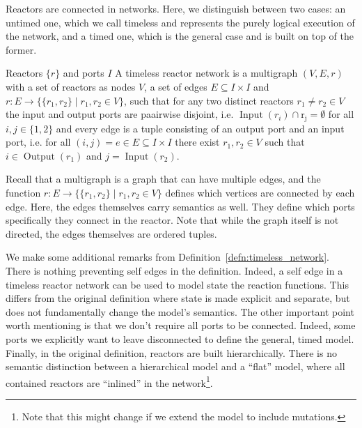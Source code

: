 Reactors are connected in networks.
Here, we distinguish between two cases: an untimed one, which we call timeless and represents the purely logical execution of the network, and a timed one, which is the general case and is built on top of the former.
\begin{defn}
    \label{defn:timeless_network}
    Reactors $\{ r \}$ and ports $I$
A timeless reactor network is a multigraph $(V,E,r)$ with a set of reactors as nodes $V$,
a set of edges $E \subseteq I \times I$ and $r : E \rightarrow \{ \{r_1, r_2\} \mid r_1, r_2 \in V \}$,
such that for any two distinct reactors $r_1 \neq r_2 \in V$ the input and output ports are paairwise disjoint,
i.e. $\operatorname{Input}(r_i) \cap \operatorname{r_j} = \emptyset$ for all $i,j \in \{ 1, 2 \}$ and every edge is a tuple consisting of an output port and an input port,
i.e. for all $(i,j) = e \in E \subseteq I \times I$ there exist $r_1,r_2 \in V$ such that $i \in \operatorname{Output}(r_1)$ and $j = \operatorname{Input}(r_2)$.
\end{defn}

Recall that a multigraph is a graph that can have multiple edges, and the function $r : E \rightarrow \{ \{r_1, r_2\} \mid r_1, r_2 \in V \}$ defines which vertices are connected by each edge.
Here, the edges themselves carry semantics as well. They define which ports specifically they connect in the reactor.
Note that while the graph itself is not directed, the edges themselves are ordered tuples.

We make some additional remarks from Definition~\ref{defn:timeless_network}. 
There is nothing preventing self edges in the definition.
Indeed, a self edge in a timeless reactor network can be used to model state the reaction functions.
This differs from the original definition where state is made explicit and separate, but does not fundamentally change the model's semantics.
The other important point worth mentioning is that we don't require all ports to be connected.
Indeed, some ports we explicitly want to leave disconnected to define the general, timed model. 
Finally, in the original definition, reactors are built hierarchically.
There is no semantic distinction between a hierarchical model and a ``flat'' model, where all contained reactors are ``inlined'' in the network\footnote{Note that this might change if we extend the model to include mutations.}.

